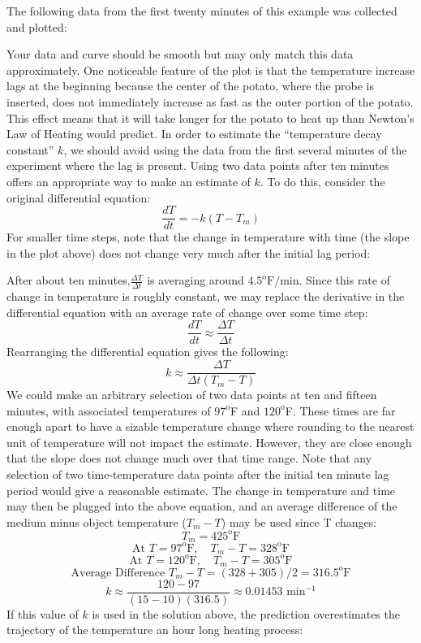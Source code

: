 \documentclass{ximera}
\begin{document}
The following data from the first twenty minutes of this example was collected and plotted:
   
Your data and curve should be smooth but may only match this data approximately.  One noticeable feature of the plot is that the temperature increase lags at the beginning because the center of the potato, where the probe is inserted, does not immediately increase as fast as the outer portion of the potato.  This effect means that it will take longer for the potato to heat up than Newton's Law of Heating would predict.  In order to estimate the ``temperature decay constant'' $k$, we should avoid using the data from the first several minutes of the experiment where the lag is present.  Using two data points after ten minutes offers an appropriate way to make an estimate of $k$.  To do this, consider the original differential equation:
\[
\frac{dT}{dt}=-k(T-T_m)
\]
For smaller time steps, note that the change in temperature with time (the slope in the plot above) does not change very much after the initial lag period:
  
 
After about ten minutes,$\frac{\Delta T}{\Delta t}$ is averaging around $4.5^{\text{o}}\text{F}/\text{min}$.  Since this rate of change in temperature is roughly constant, we may replace the derivative in the differential equation with an average rate of change over some time step:
\[
\frac{dT}{dt}\approx \frac{\Delta T}{\Delta t}
\]
Rearranging the differential equation gives the following:
\[
k\approx \frac{\Delta T}{\Delta t(T_m-T)}
\]
We could make an arbitrary selection of two data points at ten and fifteen minutes, with associated temperatures of $97^{\text{o}}$F and $120^{\text{o}}$F.  These times are far enough apart to have a sizable temperature change where rounding to the nearest unit of temperature will not impact the estimate.  However, they are close enough that the slope does not change much over that time range.  Note that any selection of two time-temperature data points after the initial ten minute lag period would give a reasonable estimate.  The change in temperature and time may then be plugged into the above equation, and an average difference of the medium minus object temperature
($T_m-T$) may be used since T changes:
\[
T_m=425^{\text{o}}\text{F}
\]
\[
\text{At } T=97^{\text{o}}\text{F},\quad T_m-T=328^{\text{o}}\text{F}
\]
\[
\text{At } T=120^{\text{o}}\text{F},\quad T_m-T=305^{\text{o}}\text{F}
\]
\[
\text{Average Difference } T_m-T= (328+305)/2=316.5^{\text{o}}\text{F}
\]
\[
k\approx \frac{120-97}{(15-10)(316.5)} \approx 0.01453 \text{ min}^{-1}
\]
If this value of $k$ is used in the solution above, the prediction overestimates the trajectory of the temperature an hour long heating process:
  
\end{document}
